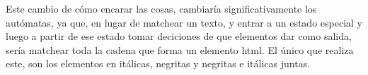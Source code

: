 \documentclass[a4paper,11pt]{article}
\begin{document}
Este cambio de cómo encarar las cosas, cambiaría significativamente los autómatas, ya que, en lugar de matchear un texto, y entrar a un estado especial y luego a partir de ese estado tomar deciciones de que elementos dar como salida, sería matchear toda la cadena que forma un elemento html. El único que realiza este, son los elementos en itálicas, negritas y negritas e itálicas juntas.
\end{document}
